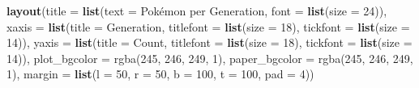 \documentclass[
]{article}
\newenvironment{Shaded}{\begin{snugshade}}{\end{snugshade}}
\newcommand{\AttributeTok}[1]{\textcolor[rgb]{0.13,0.29,0.53}{#1}}
\newcommand{\DecValTok}[1]{\textcolor[rgb]{0.00,0.00,0.81}{#1}}
\newcommand{\FunctionTok}[1]{\textcolor[rgb]{0.13,0.29,0.53}{\textbf{#1}}}
\newcommand{\NormalTok}[1]{#1}
\newcommand{\StringTok}[1]{\textcolor[rgb]{0.31,0.60,0.02}{#1}}
\begin{document}
\begin{Shaded}
\begin{Highlighting}[]
\FunctionTok{layout}\NormalTok{(}\AttributeTok{title =} \FunctionTok{list}\NormalTok{(}\AttributeTok{text =} \StringTok{\textquotesingle{}Pokémon per Generation\textquotesingle{}}\NormalTok{, }\AttributeTok{font =} \FunctionTok{list}\NormalTok{(}\AttributeTok{size =} \DecValTok{24}\NormalTok{)),}
       \AttributeTok{xaxis =} \FunctionTok{list}\NormalTok{(}\AttributeTok{title =} \StringTok{\textquotesingle{}Generation\textquotesingle{}}\NormalTok{, }\AttributeTok{titlefont =} \FunctionTok{list}\NormalTok{(}\AttributeTok{size =} \DecValTok{18}\NormalTok{), }\AttributeTok{tickfont =} \FunctionTok{list}\NormalTok{(}\AttributeTok{size =} \DecValTok{14}\NormalTok{)),}
       \AttributeTok{yaxis =} \FunctionTok{list}\NormalTok{(}\AttributeTok{title =} \StringTok{\textquotesingle{}Count\textquotesingle{}}\NormalTok{, }\AttributeTok{titlefont =} \FunctionTok{list}\NormalTok{(}\AttributeTok{size =} \DecValTok{18}\NormalTok{), }\AttributeTok{tickfont =} \FunctionTok{list}\NormalTok{(}\AttributeTok{size =} \DecValTok{14}\NormalTok{)),}
       \AttributeTok{plot\_bgcolor =} \StringTok{\textquotesingle{}rgba(245, 246, 249, 1)\textquotesingle{}}\NormalTok{,}
       \AttributeTok{paper\_bgcolor =} \StringTok{\textquotesingle{}rgba(245, 246, 249, 1)\textquotesingle{}}\NormalTok{,}
       \AttributeTok{margin =} \FunctionTok{list}\NormalTok{(}\AttributeTok{l =} \DecValTok{50}\NormalTok{, }\AttributeTok{r =} \DecValTok{50}\NormalTok{, }\AttributeTok{b =} \DecValTok{100}\NormalTok{, }\AttributeTok{t =} \DecValTok{100}\NormalTok{, }\AttributeTok{pad =} \DecValTok{4}\NormalTok{))}
\end{Highlighting}
\end{Shaded}
\end{document}
